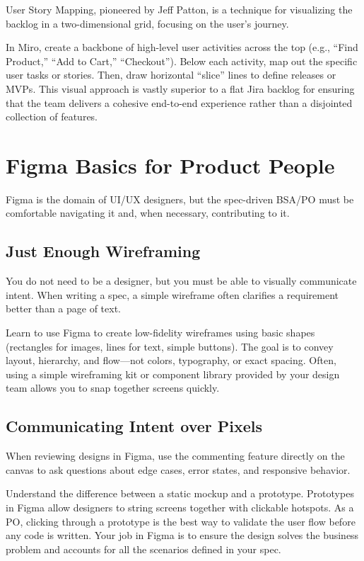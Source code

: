 \documentclass[
  11pt,
  openany,
  oneside]{book}
\begin{document}
User Story Mapping, pioneered by Jeff Patton, is a technique for
visualizing the backlog in a two-dimensional grid, focusing on the
user's journey.

In Miro, create a backbone of high-level user activities across the top
(e.g., ``Find Product,'' ``Add to Cart,'' ``Checkout''). Below each
activity, map out the specific user tasks or stories. Then, draw
horizontal ``slice'' lines to define releases or MVPs. This visual
approach is vastly superior to a flat Jira backlog for ensuring that the
team delivers a cohesive end-to-end experience rather than a disjointed
collection of features.

\section{Figma Basics for Product
People}\label{figma-basics-for-product-people}

Figma is the domain of UI/UX designers, but the spec-driven BSA/PO must
be comfortable navigating it and, when necessary, contributing to it.

\subsection{Just Enough Wireframing}\label{just-enough-wireframing}

You do not need to be a designer, but you must be able to visually
communicate intent. When writing a spec, a simple wireframe often
clarifies a requirement better than a page of text.

Learn to use Figma to create low-fidelity wireframes using basic shapes
(rectangles for images, lines for text, simple buttons). The goal is to
convey layout, hierarchy, and flow---not colors, typography, or exact
spacing. Often, using a simple wireframing kit or component library
provided by your design team allows you to snap together screens
quickly.

\subsection{Communicating Intent over
Pixels}\label{communicating-intent-over-pixels}

When reviewing designs in Figma, use the commenting feature directly on
the canvas to ask questions about edge cases, error states, and
responsive behavior.

Understand the difference between a static mockup and a prototype.
Prototypes in Figma allow designers to string screens together with
clickable hotspots. As a PO, clicking through a prototype is the best
way to validate the user flow before any code is written. Your job in
Figma is to ensure the design solves the business problem and accounts
for all the scenarios defined in your spec.
\end{document}
